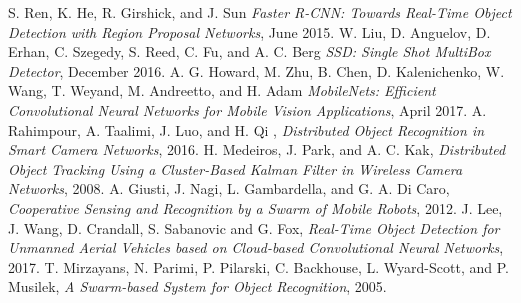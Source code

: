 \documentclass[10pt,conference,compsocconf]{IEEEtran}
\begin{document}
\begin{thebibliography}{1}
\label{reference0}
S. Ren, K. He, R. Girshick, and J. Sun \emph{Faster R-CNN: Towards Real-Time Object
Detection with Region Proposal Networks}, June 2015.
\vspace*{-0.8\baselineskip}
\label{reference1}
W. Liu, D. Anguelov, D. Erhan, C. Szegedy, S. Reed, C. Fu, and A. C. Berg \emph{SSD: Single Shot MultiBox Detector}, December 2016.
\vspace*{-0.8\baselineskip}
\label{reference2}
A. G. Howard, M. Zhu, B. Chen, D. Kalenichenko, W. Wang, T. Weyand, M. Andreetto, and H. Adam \emph{MobileNets: Efficient Convolutional Neural Networks for Mobile Vision Applications}, April 2017.
\vspace*{-0.8\baselineskip}
\label{reference3}
A. Rahimpour, A. Taalimi, J. Luo, and H. Qi , \emph{Distributed Object Recognition in Smart Camera Networks}, 2016.
\vspace*{-0.8\baselineskip}
\label{reference4}
H. Medeiros, J. Park, and A. C. Kak, \emph{Distributed Object Tracking Using a Cluster-Based Kalman Filter in Wireless Camera Networks}, 2008.
\vspace*{-0.8\baselineskip}
\label{reference5}
A. Giusti, J. Nagi, L. Gambardella, and G. A. Di Caro, \emph{Cooperative Sensing and Recognition by a Swarm of Mobile Robots}, 2012.
\vspace*{-0.8\baselineskip}
\label{reference6}
J. Lee, J. Wang, D. Crandall, S. Sabanovic and G. Fox, \emph{Real-Time Object Detection for Unmanned Aerial Vehicles based on Cloud-based Convolutional Neural Networks}, 2017.
\vspace*{-0.8\baselineskip}
\label{reference7}
T. Mirzayans, N. Parimi, P. Pilarski, C. Backhouse, L. Wyard-Scott, and P. Musilek, \emph{A Swarm-based System for Object Recognition}, 2005.

\end{thebibliography}
\end{document}
